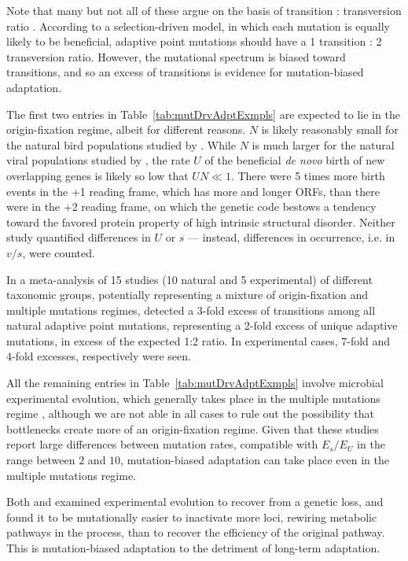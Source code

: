 \documentclass[9pt,twocolumn,twoside]{article}
\begin{document}
Note that many but not all of these argue on the basis of transition : transversion ratio \citep{Stoltzfus2017parallel,Payne2019,sackman2017mutation,Bertels2019}. According to a selection-driven model, in which each mutation is equally likely to be beneficial, adaptive point mutations should have a 1 transition : 2 transversion ratio. However, the mutational spectrum is biased toward transitions, and so an excess of transitions is evidence for mutation-biased adaptation. 

The first two entries in Table~\ref{tab:mutDrvAdptExmpls} are expected to lie in the origin-fixation regime, albeit for different reasons. $N$ is likely reasonably small for the natural bird populations studied by \citet{storz2019role}. While $N$ is much larger for the natural viral populations studied by \citet{Willis2018}, the rate $U$ of the beneficial \textit{de novo} birth of new overlapping genes is likely so low that $UN \ll 1$. There were 5 times more birth events in the +1 reading frame, which has more and longer ORFs, than there were in the +2 reading frame, on which the genetic code bestows a tendency toward the favored protein property of high intrinsic structural disorder. Neither study quantified differences in $U$ or $s$ --- instead, differences in occurrence, i.e. in $v/s$, were counted.

In a meta-analysis of 15 studies (10 natural and 5 experimental) of different taxonomic groups, potentially representing a mixture of origin-fixation and multiple mutations regimes, \citet{Stoltzfus2017parallel} detected a 3-fold excess of transitions among all natural adaptive point mutations, representing a 2-fold excess of unique adaptive mutations, in excess of the expected 1:2 ratio. In experimental cases, 7-fold and 4-fold excesses, respectively were seen.

All the remaining entries in Table~\ref{tab:mutDrvAdptExmpls} involve microbial experimental evolution, which generally takes place in the multiple mutations regime \citep{Levy2015,Good2015,good2017dynamics}, although we are not able in all cases to rule out the possibility that bottlenecks create more of an origin-fixation regime. Given that these studies report large  differences between mutation rates, compatible with $E_s/E_U$ in the range between $2$ and $10$, mutation-biased adaptation can take place even in the multiple mutations regime.

Both \citet{rodrigues2019adaptation} and \citet{schober2019two} examined experimental evolution to recover from a genetic loss, and found it to be mutationally easier to inactivate more loci, rewiring metabolic pathways in the process, than to recover the efficiency of the original pathway. This is mutation-biased adaptation to the detriment of long-term adaptation.
\end{document}
